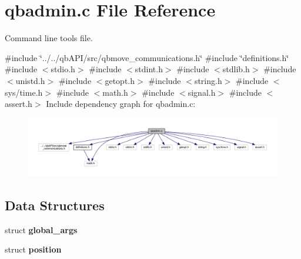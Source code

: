 \section{qbadmin.\+c File Reference}
\label{qbadmin_8c}


Command line tools file.  


{\ttfamily \#include \char`\"{}../../qb\+A\+P\+I/src/qbmove\+\_\+communications.\+h\char`\"{}}\newline
{\ttfamily \#include \char`\"{}definitions.\+h\char`\"{}}\newline
{\ttfamily \#include $<$stdio.\+h$>$}\newline
{\ttfamily \#include $<$stdint.\+h$>$}\newline
{\ttfamily \#include $<$stdlib.\+h$>$}\newline
{\ttfamily \#include $<$unistd.\+h$>$}\newline
{\ttfamily \#include $<$getopt.\+h$>$}\newline
{\ttfamily \#include $<$string.\+h$>$}\newline
{\ttfamily \#include $<$sys/time.\+h$>$}\newline
{\ttfamily \#include $<$math.\+h$>$}\newline
{\ttfamily \#include $<$signal.\+h$>$}\newline
{\ttfamily \#include $<$assert.\+h$>$}\newline
Include dependency graph for qbadmin.\+c\+:\nopagebreak
\begin{figure}[H]
\begin{center}
\leavevmode
\includegraphics[width=350pt]{qbadmin_8c__incl}
\end{center}
\end{figure}
\subsection*{Data Structures}
\begin{DoxyCompactItemize}
\item 
struct \textbf{ global\+\_\+args}
\item 
struct \textbf{ position}
\end{DoxyCompactItemize}
